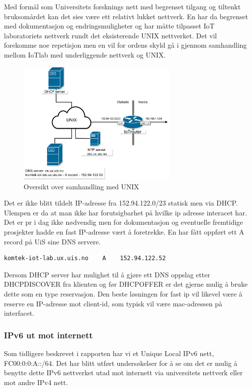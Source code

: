 \documentclass{article}
\begin{document}
Med formål som Universitets forsknings nett med begrenset tilgang og tiltenkt bruksomårdet kan det sies være ett relativt lukket nettverk. En har da begrenset med dokumentasjon og endringsmuligheter og har måtte tilpasset IoT laboratoriets nettverk rundt det eksisterende UNIX nettverket. Det vil forekomme noe repetisjon men en vil for ordens skyld gå i gjennom samhandling mellom IoTlab med underliggende nettverk og UNIX. 

\begin{figure} [!ht]
  \centering
      \includegraphics[width=0.7\textwidth]{unixnett}
  \caption{Oversikt over samhandling med UNIX}
\end{figure}


Det er ikke blitt tildelt IP-adresse fra 152.94.122.0/23 statisk men via DHCP. Ulempen er da at man ikke har forutsigbarhet på hvilke ip adresse interacet har. Det er pr i dag ikke nødvendig men for dokumentasjon og eventuelle fremtidige prosjekter hadde en fast IP-adresse vært å foretrekke. En har fått oppført ett A record på UiS sine DNS servere. 

\begin{verbatim}
komtek-iot-lab.ux.uis.no    A    152.94.122.52
\end{verbatim}

Dersom DHCP server har mulighet til å gjøre ett DNS oppslag etter DHCPDISCOVER fra klienten og før DHCPOFFER er det gjerne mulig å bruke dette som en type reservasjon. Den beste løsningen for fast ip vil likevel være å reserve en IP-adresse mot client-id, som typisk vil være mac-adressen på interfacet. 

\subsubsection{IPv6 ut mot internett}
Som tidligere beskrevet i rapporten har vi et Unique Local IPv6 nett, FC00:0:0:A::/64. Det har blitt utført undersøkelser for å se om det er mulig å benytte dette IPv6 nettverket utad mot internett via universitets nettverk eller mot andre IPv4 nett. 
\end{document}
